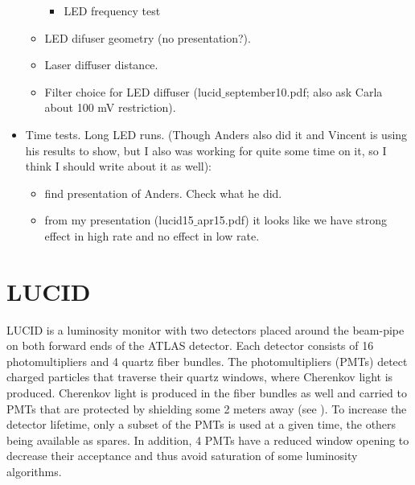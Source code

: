 \begin{itemize}
\begin{itemize}
\begin{itemize}
   \item LED frequency test
  \end{itemize}
  
  \item LED difuser geometry (no presentation?).
  \item Laser diffuser distance.
  \item Filter choice for LED diffuser (lucid$\_$september10.pdf; also ask Carla about 100 mV restriction).
 \end{itemize}
 
 \item Time tests. Long LED runs. (Though Anders also did it and Vincent is using his results to show, but I also was working for quite some time on it, so I think I should write about it as well):
 \begin{itemize}
  \item find presentation of Anders. Check what he did.
  \item from my presentation (lucid15$\_$apr15.pdf) it looks like we have strong effect in high rate and no effect in low rate.
 \end{itemize}
\end{itemize}

\newpage

\section{LUCID}
LUCID is a luminosity monitor with two detectors placed around the beam-pipe on both forward ends of the ATLAS detector. 
Each detector consists of 16 photomultipliers and 4 quartz fiber bundles. The photomultipliers (PMTs) detect charged 
particles that traverse their quartz windows, where Cherenkov light is produced. Cherenkov light is produced in 
the fiber bundles as well and carried to PMTs that are protected by shielding some 2 meters away 
(see ). To increase the detector lifetime, only a subset of the PMTs is used at a 
given time, the others being available as spares. In addition, 4 PMTs have a reduced window opening to decrease 
their acceptance and thus avoid saturation of some luminosity algorithms.

